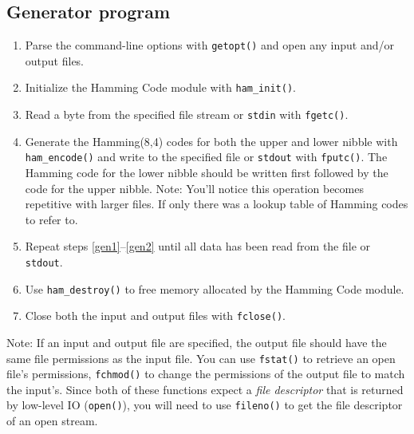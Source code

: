 \documentclass[11pt]{article}
\begin{document}
\subsection{Generator program}
\begin{enumerate}
    \item Parse the command-line options with \texttt{getopt()} and open any input and/or output files.
    \item Initialize the Hamming Code module with \texttt{ham\_init()}.
    \item Read a byte from the specified file stream or \texttt{stdin} with \texttt{fgetc()}. \label{gen1}
    \item Generate the Hamming(8,4) codes for both the upper and lower nibble 
    with \texttt{ham\_encode()} and write to the specified \label{gen2}
    file or \texttt{stdout} with \texttt{fputc()}. The Hamming code for the lower nibble should be written
    first followed by the code for the upper nibble. Note: You'll notice this operation becomes repetitive
    with larger files. If only there was a lookup table of Hamming codes to refer to.
    \item Repeat steps \ref{gen1}--\ref{gen2} until all data has been read from the file or \texttt{stdout}.
    \item Use \texttt{ham\_destroy()} to free memory allocated by the Hamming Code module.
    \item Close both the input and output files with \texttt{fclose()}.
\end{enumerate}

Note: If an input and output file are specified, the output file should have the same file permissions as
the input file. You can use \texttt{fstat()} to retrieve an open file's permissions, \texttt{fchmod()}
to change the permissions of the output file to match the input's. Since both of these functions
expect a \emph{file descriptor} that is returned by low-level IO (\texttt{open()}), you will need
to use \texttt{fileno()} to get the file descriptor of an open stream.
\end{document}
